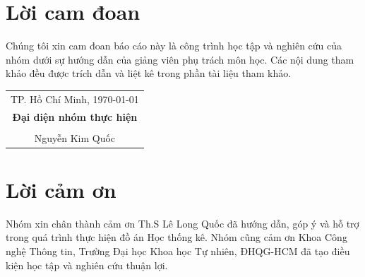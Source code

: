 \chapter*{Lời cam đoan}
Chúng tôi xin cam đoan báo cáo này là công trình học tập và nghiên cứu của nhóm dưới sự hướng dẫn của giảng viên phụ trách môn học. Các nội dung tham khảo đều được trích dẫn và liệt kê trong phần tài liệu tham khảo.

\vspace{2cm}
\begin{flushright}
\begin{tabular}{c}
TP. Hồ Chí Minh, \today \\
\textbf{Đại diện nhóm thực hiện} \\
\vspace{1.8cm} \\
Nguyễn Kim Quốc
\end{tabular}
\end{flushright}
\clearpage

\chapter*{Lời cảm ơn}
Nhóm xin chân thành cảm ơn Th.S Lê Long Quốc đã hướng dẫn, góp ý và hỗ trợ trong quá trình thực hiện đồ án Học thống kê. Nhóm cũng cảm ơn Khoa Công nghệ Thông tin, Trường Đại học Khoa học Tự nhiên, ĐHQG-HCM đã tạo điều kiện học tập và nghiên cứu thuận lợi.
\clearpage
